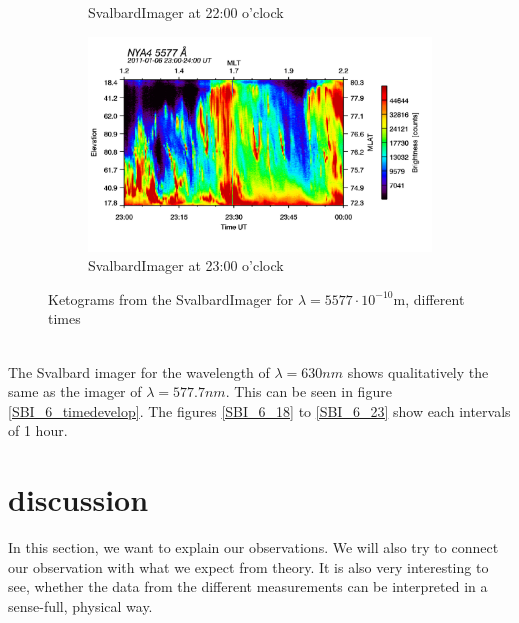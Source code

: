 \documentclass[10pt,a4paper]{article}
\begin{document}
\begin{figure}[h]
\begin{subfigure}{0.3\textwidth}
	\caption{ SvalbardImager at 22:00 o'clock \label{SBI_5_22}}
\end{subfigure}
\begin{subfigure}{0.3\textwidth}
\centering
	\includegraphics[width=\textwidth]{SvalbardImager5577A23.png}
	\caption{ SvalbardImager at 23:00 o'clock \label{SBI_5_23}}
\end{subfigure}
\caption{Ketograms from the SvalbardImager for $\lambda=5577 \cdot 10^{-10} \mathrm{m}$, different times }
\label{SBI_5_timedevelop}
\end{figure}
\\
The Svalbard imager for the wavelength of $\lambda=630 nm$ shows qualitatively the same as the imager of $\lambda=577.7 nm$.  This can be seen in figure \ref{SBI_6_timedevelop}. The figures \ref{SBI_6_18} to \ref{SBI_6_23} show each intervals of 1 hour. 
\clearpage


\section{discussion \label{discussion}}

In this section, we want to explain our observations. We will also try to connect our observation with what we expect from theory. 
It is also very interesting to see, whether the data from the different measurements can be interpreted in a sense-full, physical way.
\end{document}
